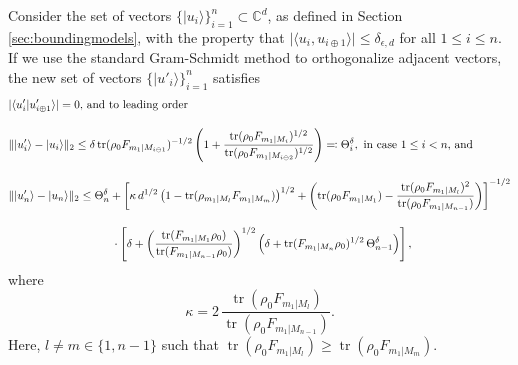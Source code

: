 \begin{lemma}
\label{lem:orthogonalize}
Consider the set of vectors $\{\vert u_i \rangle\}_{i=1}^{n}\subset \mathbb{C}^d$, as defined in Section \ref{sec:boundingmodels}, with the property that $\vert \langle u_i , u_{i\oplus 1}\rangle \vert \leq \delta_{\epsilon, d}$ for all $1\leq i \leq n$. If we use the standard Gram-Schmidt method to orthogonalize adjacent vectors, the new set of vectors $\{\vert u'_i \rangle \}_{i=1}^{n}$ satisfies
\begin{equation*}
\label{eqn:orthlem}
\begin{split}
& \vert \langle u'_i \vert u'_{i\oplus 1}\rangle\vert  = 0 \text{, and to leading order}\\[1em] 
& \|\vert u'_i \rangle - \vert u_i \rangle \|_2 \leq \delta\operatorname{tr}(\rho_0 F_{m_1\vert M_{i\ominus 1}})^{-1/2}\left(1+\frac{\operatorname{tr}(\rho_0 F_{m_1\vert M_{i}})^{1/2}}{\operatorname{tr}(\rho_0 F_{m_1\vert M_{i\ominus 2}})^{1/2}}\right)\eqqcolon \Theta_i^{\delta}, \text{ in case $1\leq i<n$, and} \\[1em]
& \|\vert u'_n \rangle - \vert u_n\rangle \|_2 \leq \Theta_n^{\delta} + \left[\kappa\, d^{1/2}\left(1-\operatorname{tr}(\rho_{m_1\vert M_l } F_{m_1\vert M_m})\right)^{1/2}
+ \left(\operatorname{tr}(\rho_0 F_{m_1\vert M_1})-\frac{\operatorname{tr}(\rho_0 F_{m_1\vert M_l})^2}{\operatorname{tr}(\rho_0 F_{m_1\vert M_{n-1}})}\right)\right]^{-1/2}\\[1em]&\hspace{9.1em}\cdot \left[\delta +  \left(\frac{\operatorname{tr}(F_{m_1\vert M_1}\rho_0)}{\operatorname{tr}(F_{m_1\vert M_{n-1}}\rho_0)}\right)^{1/2}\left( \delta + \operatorname{tr}(F_{m_1\vert M_n}\rho_0)^{1/2}\,\Theta_{n-1}^{\delta} \right)\right],
\end{split}
\end{equation*}
where \[\kappa=2\, \frac{\operatorname{tr}(\rho_0 F_{m_1\vert M_{l}})}{\operatorname{tr}(\rho_0 F_{m_1\vert M_{n-1}})}.\]
Here, $l\neq m \in \{1,n-1\}$ such that $\operatorname{tr}(\rho_0 F_{m_1\vert M_l})\geq \operatorname{tr}(\rho_0 F_{m_1\vert M_m})$.
\end{lemma}
